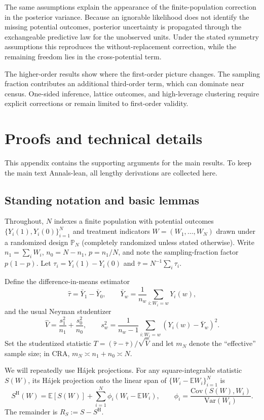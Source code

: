 \documentclass[aos]{imsart}
\theoremstyle{definition}
\theoremstyle{plain}
\begin{document}
The same assumptions explain the appearance of the finite-population correction in the posterior variance. Because an ignorable likelihood does not identify the missing potential outcomes, posterior uncertainty is propagated through the exchangeable predictive law for the unobserved units. Under the stated symmetry assumptions this reproduces the without-replacement correction, while the remaining freedom lies in the cross-potential term.

The higher-order results show where the first-order picture changes. The sampling fraction contributes an additional third-order term, which can dominate near census. One-sided inference, lattice outcomes, and high-leverage clustering require explicit corrections or remain limited to first-order validity.
\appendix

\section{Proofs and technical details}\label{app:proofs}

This appendix contains the supporting arguments for the main results.
To keep the main text Annals-lean, all lengthy derivations are collected here.

\subsection{Standing notation and basic lemmas}\label{app:notation}

Throughout, $N$ indexes a finite population with potential outcomes $\{Y_i(1),Y_i(0)\}_{i=1}^N$ and treatment indicators
$W=(W_1,\dots,W_N)$ drawn under a randomized design $\mathbb P_N$ (completely randomized unless stated otherwise).
Write $n_1=\sum_i W_i$, $n_0=N-n_1$, $p=n_1/N$, and note the sampling-fraction factor $p(1-p)$.
Let $\tau_i=Y_i(1)-Y_i(0)$ and $\bar\tau=N^{-1}\sum_i\tau_i$.

Define the difference-in-means estimator
\[
\hat\tau=\bar Y_1-\bar Y_0,\qquad \bar Y_w=\frac{1}{n_w}\sum_{i:W_i=w}Y_i(w),
\]
and the usual Neyman studentizer
\[
\hat V=\frac{s_1^2}{n_1}+\frac{s_0^2}{n_0},\qquad s_w^2=\frac{1}{n_w-1}\sum_{i:W_i=w}(Y_i(w)-\bar Y_w)^2.
\]
Set the studentized statistic $T=(\hat\tau-\bar\tau)/\sqrt{\hat V}$ and let $m_N$ denote the ``effective'' sample size; in CRA,
$m_N\asymp n_1+n_0\asymp N$.

We will repeatedly use Hájek projections. For any square-integrable statistic $S(W)$, its Hájek projection onto the linear span of
$\{W_i-\mathbb E W_i\}_{i=1}^N$ is
\[
S^\mathrm{H}(W)=\mathbb E[S(W)]+\sum_{i=1}^N \phi_i (W_i-\mathbb E W_i),
\qquad \phi_i=\frac{\mathrm{Cov}(S(W),W_i)}{\mathrm{Var}(W_i)}.
\]
The remainder is $R_S:=S-S^\mathrm{H}$.
\end{document}
